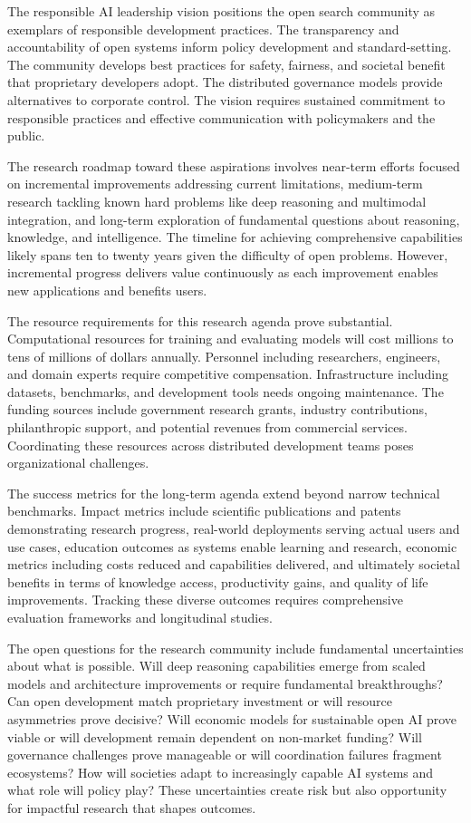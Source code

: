 The responsible AI leadership vision positions the open search community as exemplars of responsible development practices. The transparency and accountability of open systems inform policy development and standard-setting. The community develops best practices for safety, fairness, and societal benefit that proprietary developers adopt. The distributed governance models provide alternatives to corporate control. The vision requires sustained commitment to responsible practices and effective communication with policymakers and the public.

The research roadmap toward these aspirations involves near-term efforts focused on incremental improvements addressing current limitations, medium-term research tackling known hard problems like deep reasoning and multimodal integration, and long-term exploration of fundamental questions about reasoning, knowledge, and intelligence. The timeline for achieving comprehensive capabilities likely spans ten to twenty years given the difficulty of open problems. However, incremental progress delivers value continuously as each improvement enables new applications and benefits users.

The resource requirements for this research agenda prove substantial. Computational resources for training and evaluating models will cost millions to tens of millions of dollars annually. Personnel including researchers, engineers, and domain experts require competitive compensation. Infrastructure including datasets, benchmarks, and development tools needs ongoing maintenance. The funding sources include government research grants, industry contributions, philanthropic support, and potential revenues from commercial services. Coordinating these resources across distributed development teams poses organizational challenges.

The success metrics for the long-term agenda extend beyond narrow technical benchmarks. Impact metrics include scientific publications and patents demonstrating research progress, real-world deployments serving actual users and use cases, education outcomes as systems enable learning and research, economic metrics including costs reduced and capabilities delivered, and ultimately societal benefits in terms of knowledge access, productivity gains, and quality of life improvements. Tracking these diverse outcomes requires comprehensive evaluation frameworks and longitudinal studies.

The open questions for the research community include fundamental uncertainties about what is possible. Will deep reasoning capabilities emerge from scaled models and architecture improvements or require fundamental breakthroughs? Can open development match proprietary investment or will resource asymmetries prove decisive? Will economic models for sustainable open AI prove viable or will development remain dependent on non-market funding? Will governance challenges prove manageable or will coordination failures fragment ecosystems? How will societies adapt to increasingly capable AI systems and what role will policy play? These uncertainties create risk but also opportunity for impactful research that shapes outcomes.

